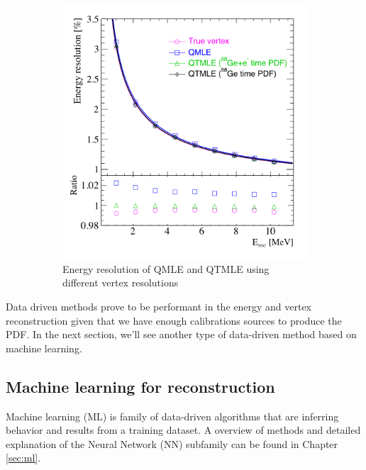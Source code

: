 \begin{figure}[ht]
\begin{subfigure}{0.48\linewidth}
    \includegraphics[width=\textwidth]{images/juno/reco/energy_qtmle.png}
    \caption{Energy resolution of QMLE and QTMLE using different vertex resolutions}
  \end{subfigure}
  \caption{}
  \label{fig:juno:rec:qtmle}
\end{figure}

Data driven methods prove to be performant in the energy and vertex reconstruction given that we have enough calibrations sources to produce the PDF. In the next section, we'll see another type of data-driven method based on machine learning.

\subsection{Machine learning for reconstruction}

Machine learning (ML) is family of data-driven algorithms that are inferring behavior and results from a training dataset. A overview of methods and detailed explanation of the Neural Network (NN) subfamily can be found in Chapter \ref{sec:ml}.


